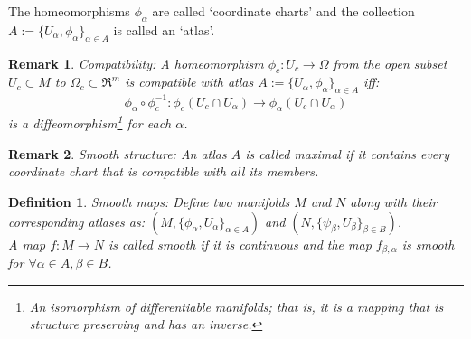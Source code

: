 \documentclass{article}
\newtheorem{definition}{Definition}
\newtheorem{remark}{Remark}
\begin{document}

The homeomorphisms $\phi_{\alpha}$ are called `coordinate charts' and the collection $A:= \{U_{\alpha}, \phi_{\alpha}\}_{\alpha \in A}$ is called an `atlas'.

\begin{remark}
        Compatibility: A homeomorphism $\phi_{c}: U_{c} \rightarrow \Omega$ from the open subset $U_{c}\subset M$ to $\Omega_{c}\subset \Re^{m}$ is compatible with atlas $A:=\{U_{\alpha}, \phi_{\alpha}\}_{\alpha \in A}$ iff: $$\phi_{\alpha}\circ \phi_{c}^{-1}: \phi_{c}(U_{c}\cap U_{\alpha}) \rightarrow \phi_{\alpha}(U_{c} \cap U_{\alpha})$$
        is a diffeomorphism\footnote{An isomorphism of differentiable manifolds; that is, it is a mapping that is structure preserving and has an inverse.} for each $\alpha$.
\end{remark}
\begin{remark}
        Smooth structure: An atlas $A$ is called maximal if it contains every coordinate chart that is compatible with all its members.
\end{remark}

\begin{definition}
        Smooth maps:
        Define two manifolds $M$ and $N$ along with their corresponding atlases as: $(M, \{ \phi_{\alpha}, U_{\alpha} \}_{\alpha \in A})$ and $(N, \{ \psi_{\beta}, U_{\beta} \} _{\beta \in B})$. \\A map $f: M \rightarrow N$ is called smooth if it is continuous and the map $f_{\beta, \alpha}$ is smooth for $\forall \alpha \in A, \beta \in B$. \\
        
\end{definition}
\end{document}
